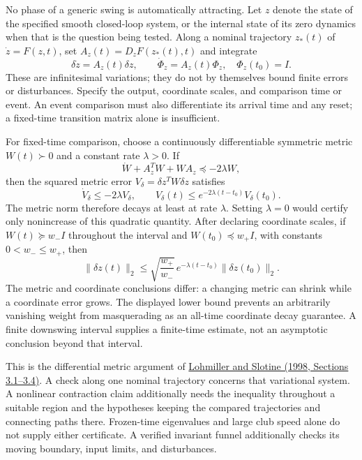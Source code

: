 \documentclass[12pt, openany]{book}
\theoremstyle{plain}
\begin{document}
No phase of a generic swing is automatically attracting. Let $z$ denote the
state of the specified smooth closed-loop system, or the internal state of
its zero dynamics when that is the question being tested. Along a nominal
trajectory $z_*(t)$ of $\dot z=F(z,t)$, set $A_z(t)=D_zF(z_*(t),t)$ and integrate
\begin{equation}
\delta\dot z=A_z(t)\delta z,\qquad
\dot\Phi_z=A_z(t)\Phi_z,\quad\Phi_z(t_0)=I.
\end{equation}
These are infinitesimal variations; they do not by themselves bound finite
errors or disturbances. Specify the output, coordinate scales, and comparison
time or event. An event comparison must also differentiate its arrival time
and any reset; a fixed-time transition matrix alone is insufficient.

For fixed-time comparison, choose a continuously differentiable symmetric
metric $W(t)\succ0$ and a constant rate $\lambda>0$. If
\begin{equation}
\dot W+A_z^TW+WA_z\preceq-2\lambda W,
\end{equation}
then the squared metric error $V_\delta=\delta z^TW\delta z$ satisfies
\begin{equation}
\dot V_\delta\leq-2\lambda V_\delta,\qquad
V_\delta(t)\leq e^{-2\lambda(t-t_0)}V_\delta(t_0).
\end{equation}
The metric norm therefore decays at least at rate $\lambda$. Setting
$\lambda=0$ would certify only nonincrease of this quadratic quantity.
After declaring coordinate scales, if $W(t)\succeq w_-I$ throughout the interval
and $W(t_0)\preceq w_+I$, with constants $0<w_-\leq w_+$, then
\begin{equation}
\|\delta z(t)\|_2\leq
\sqrt{\frac{w_+}{w_-}}\,e^{-\lambda(t-t_0)}\|\delta z(t_0)\|_2.
\end{equation}
The metric and coordinate conclusions differ: a changing metric can shrink
while a coordinate error grows. The displayed lower bound prevents an
arbitrarily vanishing weight from masquerading as an all-time coordinate
decay guarantee. A finite downswing interval supplies a finite-time estimate,
not an asymptotic conclusion beyond that interval.

This is the differential metric argument of \href{https://www.mit.edu/~nsl/preprints/contraction.pdf}{Lohmiller and Slotine (1998, Sections 3.1--3.4)}.
A check along one nominal trajectory concerns that variational system.
A nonlinear contraction claim additionally needs the inequality throughout
a suitable region and the hypotheses keeping the compared trajectories and
connecting paths there. Frozen-time eigenvalues and large club speed alone
do not supply either certificate. A verified invariant funnel additionally
checks its moving boundary, input limits, and disturbances.
\end{document}
